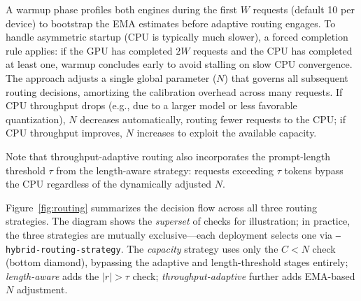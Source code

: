 \documentclass[10pt,conference]{IEEEtran}
\begin{document}
A warmup phase profiles both engines during the first $W$ requests (default 10 per device) to bootstrap the EMA estimates before adaptive routing engages.
To handle asymmetric startup (CPU is typically much slower), a forced completion rule applies: if the GPU has completed $2W$ requests and the CPU has completed at least one, warmup concludes early to avoid stalling on slow CPU convergence.
The approach adjusts a single global parameter ($N$) that governs all subsequent routing decisions, amortizing the calibration overhead across many requests.
If CPU throughput drops (e.g., due to a larger model or less favorable quantization), $N$ decreases automatically, routing fewer requests to the CPU; if CPU throughput improves, $N$ increases to exploit the available capacity.

Note that throughput-adaptive routing also incorporates the prompt-length threshold $\tau$ from the length-aware strategy: requests exceeding $\tau$ tokens bypass the CPU regardless of the dynamically adjusted $N$.

Figure~\ref{fig:routing} summarizes the decision flow across all three routing strategies.
The diagram shows the \emph{superset} of checks for illustration; in practice, the three strategies are mutually exclusive---each deployment selects one via \texttt{--hybrid-routing-strategy}.
The \emph{capacity} strategy uses only the $C < N$ check (bottom diamond), bypassing the adaptive and length-threshold stages entirely; \emph{length-aware} adds the $|r| > \tau$ check; \emph{throughput-adaptive} further adds EMA-based $N$ adjustment.
\end{document}
